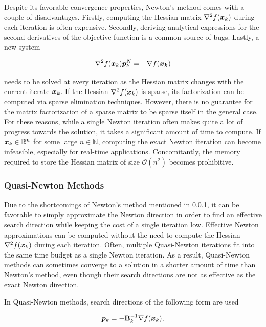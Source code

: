 Despite its favorable convergence properties, Newton's method comes with a couple of disadvantages. Firstly, computing the Hessian matrix
$\nabla^2 f(\bm{x}_k)$ during each iteration is often expensive. Secondly, deriving analytical expressions for the second derivatives of 
the objective function is a common source of bugs. Lastly, a new system 

\[
    \nabla^2 f(\bm{x}_k) \bm{p}^N_k = - \nabla f(\bm{x_k})
\]

\noindent needs to be solved at every iteration as the Hessian matrix changes with the current iterate $\bm{x}_k$.
If the Hessian $\nabla^2 f(\bm{x}_k)$ is sparse, its factorization can be computed via sparse elimination techniques. However, there is no
guarantee for the matrix factorization of a sparse matrix to be sparse itself in the general case.
For these reasons, while a single
Newton iteration often makes quite a lot of progress towards the solution, it takes a significant amount of time to compute. If $\bm{x}_k
\in \mathbb{R}^n$ for some large $n \in \mathbb{N}$, computing the exact Newton iteration can become infeasible, especially for real-time
applications. Concomitantly, the memory required to store the Hessian matrix of size $\mathcal{O}(n^2)$ becomes prohibitive.

\subsubsection{Quasi-Newton Methods}\label{sss:quasi-newton}
Due to the shortcomings of Newton's method mentioned in \cref{sss:quasi-newton}, it can be favorable to simply approximate the Newton 
direction
in order to find an effective search direction while keeping the cost of a single iteration low. Effective Newton approximations can be 
computed without the need to compute the Hessian $\nabla^2 f(\bm{x}_k)$ during each iteration. Often, multiple Quasi-Newton 
iterations fit into the same time budget as a single Newton iteration. As a result, Quasi-Newton methods can sometimes converge to a 
solution in a shorter amount of time than Newton's method, even though their search directions are not as effective as the exact 
Newton direction.

In Quasi-Newton methods, search directions of the following form are used

\begin{equation}\label{eq:quasi-newton-direction}
    \bm{p}_k = -\mathbf{B}^{-1}_k \nabla f(\bm{x}_k),
\end{equation}

